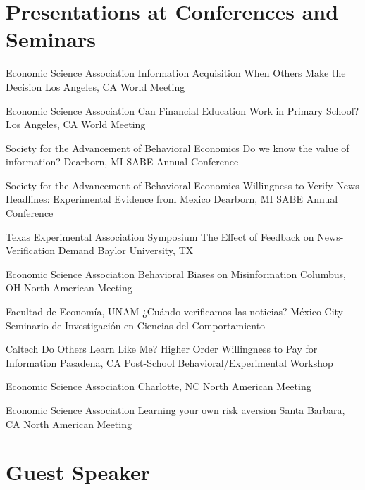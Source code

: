 \section{Presentations at Conferences and Seminars}

{Economic Science Association}
{Information Acquisition When Others Make the Decision}
{Los Angeles, CA}
{}
{World Meeting}

{Economic Science Association}
{Can Financial Education Work in Primary School?}
{Los Angeles, CA}
{}
{World Meeting}

{Society for the Advancement of Behavioral Economics}
{Do we know the value of information?}
{Dearborn, MI}
{}
{SABE Annual Conference}

{Society for the Advancement of Behavioral Economics}
{Willingness to Verify News Headlines: Experimental Evidence from Mexico}
{Dearborn, MI}
{}
{SABE Annual Conference}

{Texas Experimental Association Symposium}
{The Effect of Feedback on News-Verification Demand}
{Baylor University, TX}
{}
{}


{Economic Science Association}
{Behavioral Biases on Misinformation}
{Columbus, OH}
{}
{North American Meeting}

{Facultad de Economía, UNAM}
{¿Cuándo verificamos las noticias?}
{México City}
{}
{Seminario de Investigación en Ciencias del Comportamiento }

{Caltech}
{Do Others Learn Like Me? Higher Order Willingness to Pay for Information}
{Pasadena, CA}
{}
{Post-School Behavioral/Experimental Workshop}


{Economic Science Association}
{
}
{Charlotte, NC}
{}
{North American Meeting}

{Economic Science Association}
{Learning your own risk aversion}
{Santa Barbara, CA}
{}
{North American Meeting}

\section{Guest Speaker}

